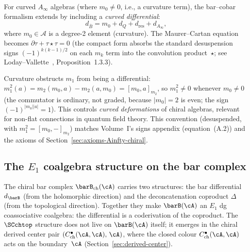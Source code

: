 \begin{remark}
For curved $A_\infty$ algebras (where $m_0 \neq 0$, i.e., a curvature term), the bar--cobar formalism extends by including a \emph{curved differential}:
\begin{equation}
d_{\overline{B}} = m_0 + d_Q + d_{\text{res}} + d_{A_\infty},
\end{equation}
where $m_0 \in \mathcal{A}$ is a degree-2 element (curvature). The Maurer--Cartan equation becomes $\partial\tau + \tau\star\tau = 0$ (the compact form absorbs the standard desuspension signs $(-1)^{k(k-1)/2}$ on each $m_k$ term into the convolution product~$\star$; see Loday--Vallette~\cite{LV12}, Proposition~1.3.3).

Curvature obstructs $m_1$ from being a differential:
$m_1^2(a) = m_2(m_0, a) - m_2(a, m_0) = [m_0, a]_{m_2}$,
so $m_1^2 \neq 0$ whenever $m_0 \neq 0$ (the commutator is ordinary, not graded, because $|m_0| = 2$ is even; the sign $(-1)^{|m_0||a|} = 1$).
This controls \emph{curved deformations} of chiral algebras, relevant for non-flat connections in quantum field theory.
This convention (desuspended, with $m_1^2 = [m_0, -]_{m_2}$) matches Volume~I's signs appendix (equation~(A.2)) and the axioms of Section~\ref{sec:axioms-Ainfty-chiral}.
\end{remark}

\subsection{The $E_1$ coalgebra structure on the bar complex}
\label{subsec:bar-swiss-cheese}

The chiral bar complex $\barB_{\mathrm{ch}}(\cA)$ carries two
structures: the bar differential $d_{\barB}$ (from the holomorphic
direction) and the deconcatenation coproduct $\Delta$ (from the
topological direction). Together they make $\barB(\cA)$ an $E_1$ dg
coassociative coalgebra: the differential is a coderivation of the
coproduct. The $\SCchtop$ structure does not live on $\barB(\cA)$
itself; it emerges in the chiral derived center pair
$(C^\bullet_{\mathrm{ch}}(\cA,\cA),\, \cA)$, where the closed colour
$C^\bullet_{\mathrm{ch}}(\cA,\cA)$ acts on the boundary~$\cA$
(Section~\ref{sec:derived-center}).

